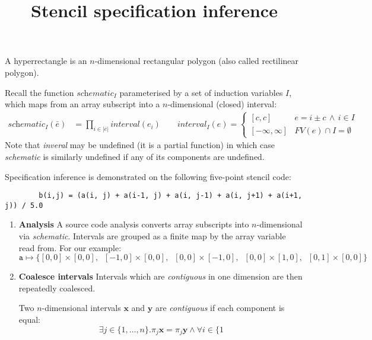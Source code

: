 \documentclass[acmlarge,review]{acmart}
\title{Stencil specification inference}
\newcommand{\vect}[1]{\textbf{#1}}
\begin{document}
\maketitle

\begin{definition}
A hyperrectangle is an $n$-dimensional rectangular polygon (also
called rectilinear polygon). 
\end{definition}

\noindent
Recall the function $\textit{schematic}_I$ parameterised by
a set of induction variables $I$, which maps
from an array subscript into a $n$-dimensional (closed) interval:
%
\begin{align*}
\textit{schematic}_I(\bar{e}) & = 
\prod_{i \in |\bar{e}|} \textit{interval}(e_i) 
\qquad
\textit{interval}_I(e) = \begin{cases}
[c, c] & e = i \pm c \, \wedge \, i \in I \\
[-\infty, \infty] & FV(e) \cap I = \emptyset
\end{cases}
\end{align*}
Note that \textit{inveral} may be undefined (it is a partial function)
in which case \textit{schematic} is similarly undefined if any of its
components are undefined.

\noindent
Specification inference is demonstrated on the following five-point
stencil code:
%
\begin{center}
\begin{verbatim}
        b(i,j) = (a(i, j) + a(i-1, j) + a(i, j-1) + a(i, j+1) + a(i+1, j)) / 5.0
\end{verbatim}
\end{center}
%

\begin{enumerate}[leftmargin=1.5em]
\item \textbf{Analysis} A source code analysis converts array subscripts into
  $n$-dimensional via \textit{schematic}. Intervals are grouped as a
  finite map  by the array variable read from. For our example:
%
\begin{equation*}
\texttt{a} \mapsto \{[0,0]\times[0,0], \;\; [-1,0]\times[0,0], \;\;
[0,0]\times[-1,0], \;\; [0,0]\times[1,0], \;\; [0,1]\times[0,0]\}
\end{equation*}
%


\item \textbf{Coalesce intervals} 
Intervals which are \emph{contiguous} in one dimension are then
repeatedly coalesced.

\begin{definition}
Two $n$-dimensional intervals $\vect{x}$ and $\vect{y}$ are 
\emph{contiguous} if each component is equal:
%
\begin{equation*}
\exists j \in \{1, \ldots, n\} . \pi_j \vect{x} = \pi_j \vect{y}
\wedge \forall i \in \{1 
\end{equation*}
%
\end{definition}

\end{enumerate}
\end{document}
